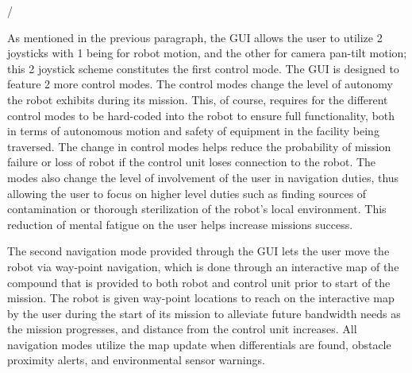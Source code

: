 /%

As mentioned in the previous paragraph, the GUI allows the user to utilize 2 joysticks with 1 being for robot motion, and the other for camera pan-tilt motion; this 2 joystick scheme constitutes the first control mode. The GUI is designed to feature 2 more control modes. The control modes change the level of autonomy the robot exhibits during its mission. This, of course, requires for the different control modes to be hard-coded into the robot to ensure full functionality, both in terms of autonomous motion and safety of equipment in the facility being traversed. The change in control modes helps reduce the probability of mission failure or loss of robot if the control unit loses connection to the robot. The modes also change the level of involvement of the user in navigation duties, thus allowing the user to focus on higher level duties such as finding sources of contamination or thorough sterilization of the robot's local environment. This reduction of mental fatigue on the user helps increase missions success. 

The second navigation mode provided through the GUI lets the user move the robot via way-point navigation, which is done through an interactive map of the compound that is provided to both robot and control unit prior to start of the mission. The robot is given way-point locations to reach on the interactive map by the user during the start of its mission to alleviate future bandwidth needs as the mission progresses, and distance from the control unit increases. All navigation modes utilize the map update when differentials are found, obstacle proximity alerts, and environmental sensor warnings.     